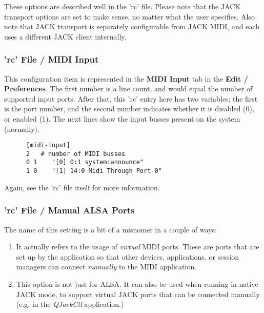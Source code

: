    These options are described well in the 'rc' file.
   Please note that the JACK transport options are set to make sense, no
   matter what the user specifies.
   Also note that JACK transport is separately configurable from
   JACK MIDI, and each uses a different JACK client internally.

\subsubsection{'rc' File / MIDI Input}
\label{subsubsec:configuration_rc_midi_input}

   This configuration item is represented in the
   \textbf{MIDI Input} tab in the \textbf{Edit / Preferences}.
   The first number is a line count, and would equal the number of
   supported input ports.
   After that, this 'rc' entry here has two variables;
   the first is the port number,
   and the second number indicates whether it is disabled (0), or enabled (1).
   The next lines show the input busses present on the system (normally).

   \begin{verbatim}
      [midi-input]
      2   # number of MIDI busses
      0 1    "[0] 0:1 system:announce"
      1 0    "[1] 14:0 Midi Through Port-0"
   \end{verbatim}

   Again, see the 'rc' file itself for more information.

\subsubsection{'rc' File / Manual ALSA Ports}
\label{subsubsec:configuration_rc_manual_ports}

   The name of this setting is a bit of a misnomer in a couple of ways:

   \begin{enumerate}
      \item It actually refers to the usage of \textsl{virtual} MIDI ports.
         These are ports that are set up by the application so that other
         devices, applications, or session managers can connect
         \textsl{manually} to the MIDI application.
      \item This option is not just for ALSA.  It can also be used when
         running in native JACK mode, to support
         virtual JACK ports that can be connected manually (e.g. in the
         \textsl{QJackCtl} application.)
   \end{enumerate}

